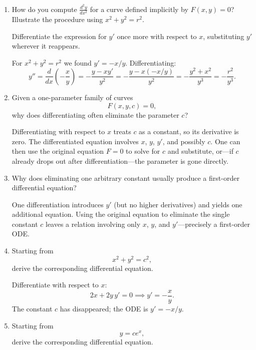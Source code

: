 \documentclass{self-check}
\begin{document}
\begin{enumerate}[leftmargin=*, itemsep=8pt]
    \begin{answer}
      A vertical tangent occurs where \(dx/dy = 0\), i.e.\ where \(-F_{y}/F_{x} = 0\), i.e.\ where \(F_{y} = 0\) but \(F_{x} \neq 0\). Equivalently, \(dy/dx\) is undefined (\(F_{y}=0\)) but the curve is smooth (a regular point in the \(x\)-direction).
    \end{answer}
  \item How do you compute \(\frac{d^{2}y}{dx^{2}}\) for a curve defined implicitly by \(F(x,y)=0\)? Illustrate the procedure using \(x^{2}+y^{2}=r^{2}\).

    \begin{answer}
      Differentiate the expression for \(y'\) once more with respect to \(x\), substituting \(y'\) wherever it reappears.

      For \(x^{2}+y^{2}=r^{2}\) we found \(y'=-x/y\). Differentiating:
      \[ y'' = \frac{d}{dx}\!\left(-\frac{x}{y}\right) = -\frac{y - x y'}{y^{2}}= -\frac{y - x(-x/y)}{y^{2}}= -\frac{y^{2} + x^{2}}{y^{3}}= -\frac{r^{2}}{y^{3}}. \]
    \end{answer}
  \item Given a one-parameter family of curves
    \[ F(x,y,c)=0, \]
    why does differentiating often eliminate the parameter \(c\)?

    \begin{answer}
      Differentiating with respect to \(x\) treats \(c\) as a constant, so its derivative is zero. The differentiated equation involves \(x\), \(y\), \(y'\), and possibly \(c\). One can then use the original equation \(F=0\) to solve for \(c\) and substitute, or---if \(c\) already drops out after differentiation---the parameter is gone directly.
    \end{answer}
  \item Why does eliminating one arbitrary constant usually produce a first-order differential equation?

    \begin{answer}
      One differentiation introduces \(y'\) (but no higher derivatives) and yields one additional equation. Using the original equation to eliminate the single constant \(c\) leaves a relation involving only \(x\), \(y\), and \(y'\)---precisely a first-order ODE.
    \end{answer}
  \item Starting from
    \[ x^{2}+y^{2}=c^{2}, \]
    derive the corresponding differential equation.

    \begin{answer}
      Differentiate with respect to \(x\):
      \[ 2x + 2y\,y' = 0 \implies y' = -\frac{x}{y}. \]
      The constant \(c\) has disappeared; the ODE is \(y' = -x/y\).
    \end{answer}
  \item Starting from
    \[ y=ce^{x}, \]
    derive the corresponding differential equation.


\end{enumerate}
\end{document}
